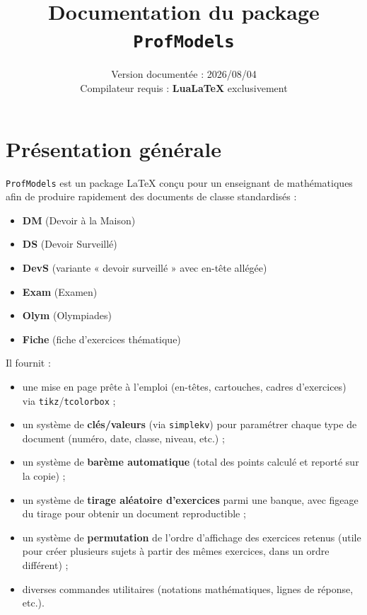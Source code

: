 \documentclass[11pt,a4paper]{article}
\title{\Huge\bfseries\color{pfmblue} Documentation du package \texttt{ProfModels}}
\author{}
\date{Version documentée : 2026/08/04 \\ Compilateur requis : \textbf{LuaLaTeX} exclusivement}
\newcommand{\pkg}[1]{\texttt{#1}}
\begin{document}
\maketitle
\thispagestyle{empty}

\tableofcontents
\newpage

\section{Présentation générale}

\pkg{ProfModels} est un package LaTeX conçu pour un enseignant de mathématiques afin de produire rapidement des documents de classe standardisés :

\begin{itemize}
  \item \textbf{DM} (Devoir à la Maison)
  \item \textbf{DS} (Devoir Surveillé)
  \item \textbf{DevS} (variante « devoir surveillé » avec en-tête allégée)
  \item \textbf{Exam} (Examen)
  \item \textbf{Olym} (Olympiades)
  \item \textbf{Fiche} (fiche d'exercices thématique)
\end{itemize}

Il fournit :

\begin{itemize}
  \item une mise en page prête à l'emploi (en-têtes, cartouches, cadres d'exercices) via \pkg{tikz}/\pkg{tcolorbox} ;
  \item un système de \textbf{clés/valeurs} (via \pkg{simplekv}) pour paramétrer chaque type de document (numéro, date, classe, niveau, etc.) ;
  \item un système de \textbf{barème automatique} (total des points calculé et reporté sur la copie) ;
  \item un système de \textbf{tirage aléatoire d'exercices} parmi une banque, avec figeage du tirage pour obtenir un document reproductible ;
  \item un système de \textbf{permutation} de l'ordre d'affichage des exercices retenus (utile pour créer plusieurs sujets à partir des mêmes exercices, dans un ordre différent) ;
  \item diverses commandes utilitaires (notations mathématiques, lignes de réponse, etc.).
\end{itemize}
\end{document}
